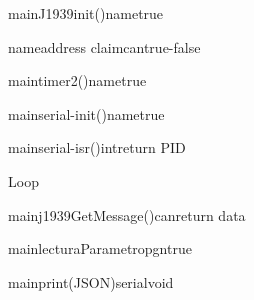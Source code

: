 \begin {sequencediagram}



 


\begin{call}{main}{J1939init()}{name}{true}
	\begin{call} 
		{name}{address claim}{can}{true-false}
	\end{call}
\end{call}

\begin{call}{main}{timer2()}{name}{true}
\end{call}

\begin{call}{main}{serial-init()}{name}{true}
\end{call}

\begin{call}{main}{serial-isr()}{int}{return PID}
\end{call}


\begin{sdblock}[blue!10]{Loop}{}

	\begin{call}[2]{main}{j1939GetMessage()}{can}{return data}
	\end{call}
	
	\begin{call}[2]{main}{lecturaParametro}{pgn}{true}\end{call}
    
    \begin{call}[2]{main}{print(JSON)}{serial}{void}
	\end{call}
    
    
	\end{sdblock}
\end {sequencediagram}